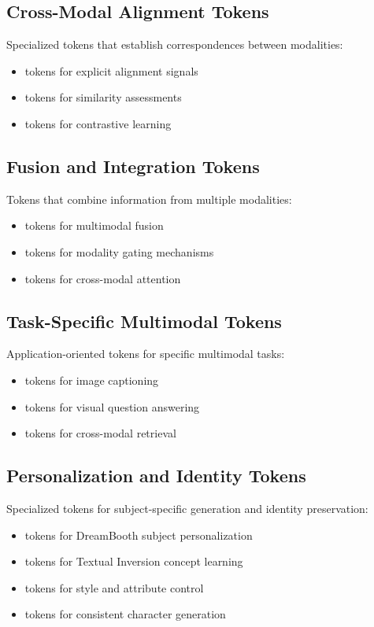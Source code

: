 \subsection{Cross-Modal Alignment Tokens}
Specialized tokens that establish correspondences between modalities:
\begin{itemize}
\item {} tokens for explicit alignment signals
\item {} tokens for similarity assessments
\item {} tokens for contrastive learning
\end{itemize}

\subsection{Fusion and Integration Tokens}
Tokens that combine information from multiple modalities:
\begin{itemize}
\item {} tokens for multimodal fusion
\item {} tokens for modality gating mechanisms
\item {} tokens for cross-modal attention
\end{itemize}

\subsection{Task-Specific Multimodal Tokens}
Application-oriented tokens for specific multimodal tasks:
\begin{itemize}
\item {} tokens for image captioning
\item {} tokens for visual question answering
\item {} tokens for cross-modal retrieval
\end{itemize}

\subsection{Personalization and Identity Tokens}
Specialized tokens for subject-specific generation and identity preservation:
\begin{itemize}
\item {} tokens for DreamBooth subject personalization
\item {} tokens for Textual Inversion concept learning
\item {} tokens for style and attribute control
\item {} tokens for consistent character generation
\end{itemize}

